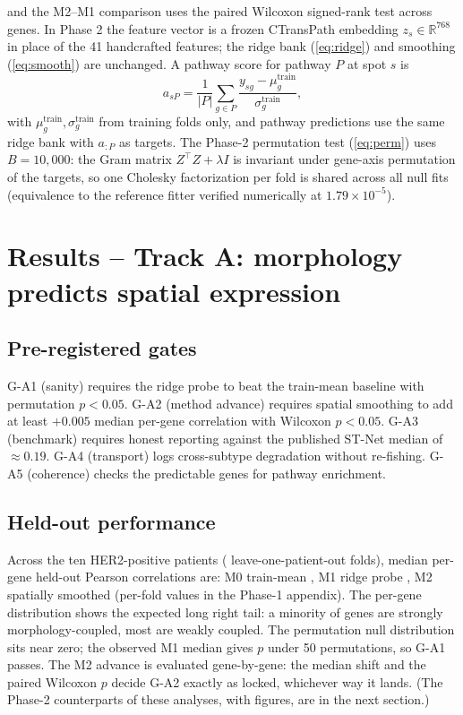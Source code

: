 \documentclass[11pt]{article}
\begin{document}
and the M2--M1 comparison uses the paired Wilcoxon signed-rank test across genes.
In Phase 2 the feature vector is a frozen CTransPath embedding $z_s \in
\mathbb{R}^{768}$ in place of the 41 handcrafted features; the ridge bank
(\ref{eq:ridge}) and smoothing (\ref{eq:smooth}) are unchanged. A pathway score for
pathway $P$ at spot $s$ is
\begin{equation}
a_{sP} = \frac{1}{|P|}\sum_{g \in P} \frac{y_{sg} - \mu_g^{\text{train}}}{\sigma_g^{\text{train}}},
\label{eq:pathway}
\end{equation}
with $\mu_g^{\text{train}}, \sigma_g^{\text{train}}$ from training folds only, and
pathway predictions use the same ridge bank with $a_{:P}$ as targets. The Phase-2
permutation test (\ref{eq:perm}) uses $B = 10{,}000$: the Gram matrix
$Z^{\top}Z + \lambda I$ is invariant under gene-axis permutation of the targets, so
one Cholesky factorization per fold is shared across all null fits (equivalence to
the reference fitter verified numerically at $1.79\times10^{-5}$).

\section{Results -- Track A: morphology predicts spatial expression}
\subsection{Pre-registered gates}
G-A1 (sanity) requires the ridge probe to beat the train-mean baseline with
permutation $p < 0.05$. G-A2 (method advance) requires spatial smoothing to add at
least $+0.005$ median per-gene correlation with Wilcoxon $p < 0.05$. G-A3 (benchmark)
requires honest reporting against the published ST-Net median of $\approx 0.19$.
G-A4 (transport) logs cross-subtype degradation without re-fishing. G-A5 (coherence)
checks the predictable genes for pathway enrichment.

\subsection{Held-out performance}
Across the ten HER2-positive patients (\numFolds{} leave-one-patient-out folds),
median per-gene held-out Pearson correlations are: M0 train-mean \numMedianRmZero,
M1 ridge probe \numMedianRmOne, M2 spatially smoothed \numMedianRmTwo{}
(per-fold values in the Phase-1 appendix). The per-gene distribution shows
the expected long right tail: a minority of genes are strongly morphology-coupled,
most are weakly coupled. The permutation null distribution
sits near zero; the observed M1 median gives
$p$ \numPermP{} under 50 permutations, so G-A1 passes. The M2 advance is evaluated
gene-by-gene: the median shift and the paired Wilcoxon
$p$ \numWilcoxP{} decide G-A2 exactly as locked, whichever way it lands.
(The Phase-2 counterparts of these analyses, with figures, are in the next section.)
\end{document}
